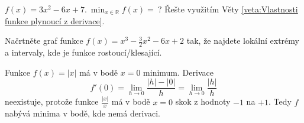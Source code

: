 \begin{úloha}
	$f(x)=3x^{2}-6x+7.\ \min_{x\in \mathbb{R}}f(x)=\ ?$ Řešte využitím Věty \ref{veta:Vlastnosti funkce plynoucí z derivace}.
\end{úloha}

\begin{úloha}
  Načrtněte graf funkce $f(x)=x^{3}-\frac{3}{2}x^{2}-6x+2$ tak, že najdete lokální extrémy a intervaly, kde je funkce rostoucí/klesající.
\end{úloha}

\begin{příklad}
Funkce $f(x)=|x|$ má v bodě $x=0$ minimum. Derivace 
\begin{equation*}
	f'(0)=\lim_{h\to 0}\frac{|h|-|0|}{h}=\lim_{h\to 0}\frac{|h|}{h}
\end{equation*}
neexistuje, protože funkce $\frac{|x|}{x}$ má v bodě $x=0$ skok z hodnoty $-1$ na $+1$. Tedy $f$ nabývá minima v bodě, kde nemá derivaci.
\end{příklad}
